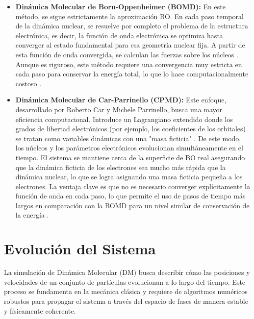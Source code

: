 \begin{itemize}
    \item \textbf{Dinámica Molecular de Born-Oppenheimer (BOMD):} En este método, se sigue estrictamente la aproximación BO. En cada paso temporal de la dinámica nuclear, se resuelve por completo el problema de la estructura electrónica, es decir, la función de onda electrónica se optimiza hasta converger al estado fundamental para esa geometría nuclear fija. A partir de esta función de onda convergida, se calculan las fuerzas sobre los núcleos \cite[125]{canuto2010solvation}. Aunque es riguroso, este método requiere una convergencia muy estricta en cada paso para conservar la energía total, lo que lo hace computacionalmente costoso \cite[457]{jensen2017introduction}.

    \item \textbf{Dinámica Molecular de Car-Parrinello (CPMD):} Este enfoque, desarrollado por Roberto Car y Michele Parrinello, busca una mayor eficiencia computacional. Introduce un Lagrangiano extendido donde los grados de libertad electrónicos (por ejemplo, los coeficientes de los orbitales) se tratan como variables dinámicas con una "masa ficticia" \cite[457]{jensen2017introduction}. De este modo, los núcleos y los parámetros electrónicos evolucionan simultáneamente en el tiempo. El sistema se mantiene cerca de la superficie de BO real asegurando que la dinámica ficticia de los electrones sea mucho más rápida que la dinámica nuclear, lo que se logra asignando una masa ficticia pequeña a los electrones. La ventaja clave es que no es necesario converger explícitamente la función de onda en cada paso, lo que permite el uso de pasos de tiempo más largos en comparación con la BOMD para un nivel similar de conservación de la energía \cite[105]{zhou2022molecular}.
\end{itemize}


\section{Evolución del Sistema}

La simulación de Dinámica Molecular (DM) busca describir cómo las posiciones y velocidades de un conjunto de partículas evolucionan a lo largo del tiempo. Este proceso se fundamenta en la mecánica clásica y requiere de algoritmos numéricos robustos para propagar el sistema a través del espacio de fases de manera estable y físicamente coherente.

